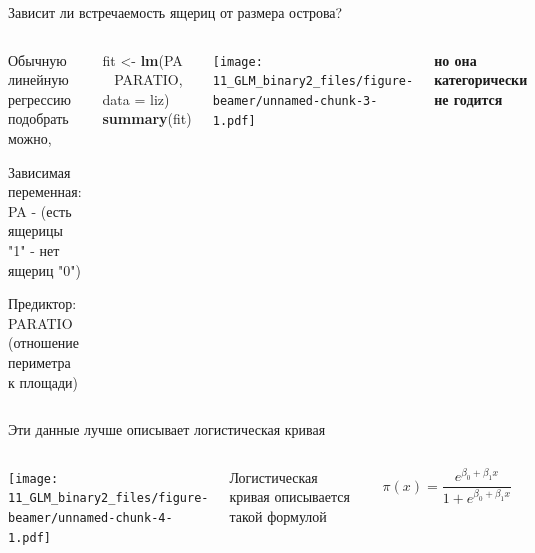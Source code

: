 \documentclass[ignorenonframetext,]{beamer}
\newenvironment{Shaded}{\begin{snugshade}}{\end{snugshade}}
\newcommand{\KeywordTok}[1]{\textcolor[rgb]{0.13,0.29,0.53}{\textbf{{#1}}}}
\newcommand{\DataTypeTok}[1]{\textcolor[rgb]{0.13,0.29,0.53}{{#1}}}
\newcommand{\StringTok}[1]{\textcolor[rgb]{0.31,0.60,0.02}{{#1}}}
\newcommand{\NormalTok}[1]{{#1}}
\newcommand{\columnsbegin}{\begin{columns}}
\newcommand{\columnsend}{\end{columns}}
\begin{document}
\begin{frame}[fragile]{Зависит ли встречаемость ящериц от размера
острова?}

\columnsbegin
{}

\begin{small}

Обычную линейную регрессию подобрать можно,

Зависимая переменная: \\
PA - (есть ящерицы "1" - нет ящериц "0")

Предиктор: \\
PARATIO (отношение периметра к площади)


\end{small}

\begin{Shaded}
\begin{Highlighting}[]
\NormalTok{fit <-}\StringTok{ }\KeywordTok{lm}\NormalTok{(PA ~}\StringTok{ }\NormalTok{PARATIO, }\DataTypeTok{data =} \NormalTok{liz)}
\KeywordTok{summary}\NormalTok{(fit)}
\end{Highlighting}
\end{Shaded}


\texttt{[image: 11\_GLM\_binary2\_files/figure-beamer/unnamed-chunk-3-1.pdf]}

\textbf {но она категорически не годится}

\columnsend

\end{frame}

\begin{frame}{Эти данные лучше описывает логистическая кривая}

\columnsbegin

\texttt{[image: 11\_GLM\_binary2\_files/figure-beamer/unnamed-chunk-4-1.pdf]}

 Логистическая кривая описывается такой формулой

\[ \pi(x) = \frac{e^{\beta_0+\beta_1x}}{1+e^{\beta_0+\beta_1x}} \]

\columnsend

\end{frame}
\end{document}
